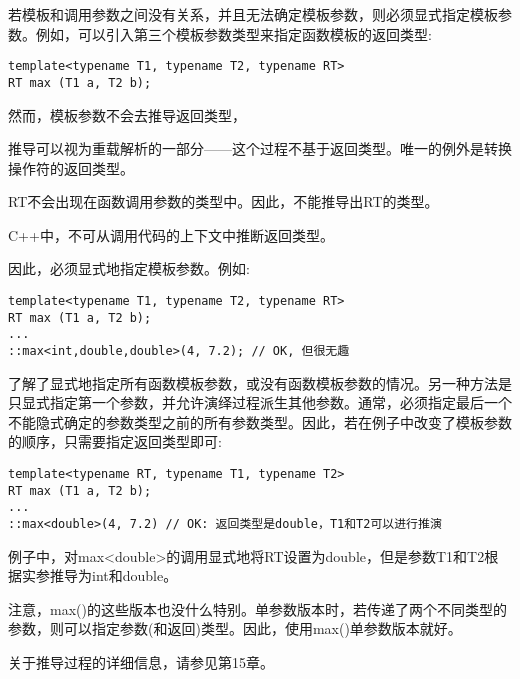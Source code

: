 若模板和调用参数之间没有关系，并且无法确定模板参数，则必须显式指定模板参数。例如，可以引入第三个模板参数类型来指定函数模板的返回类型:

\begin{lstlisting}[style=styleCXX]
template<typename T1, typename T2, typename RT>
RT max (T1 a, T2 b);
\end{lstlisting}

然而，模板参数不会去推导返回类型，

\begin{tcolorbox}[colback=webgreen!5!white,colframe=webgreen!75!black]
\hspace*{0.75cm}推导可以视为重载解析的一部分——这个过程不基于返回类型。唯一的例外是转换操作符的返回类型。
\end{tcolorbox}

RT不会出现在函数调用参数的类型中。因此，不能推导出RT的类型。

\begin{tcolorbox}[colback=webgreen!5!white,colframe=webgreen!75!black]
\hspace*{0.75cm}C++中，不可从调用代码的上下文中推断返回类型。
\end{tcolorbox}

因此，必须显式地指定模板参数。例如:

\begin{lstlisting}[style=styleCXX]
template<typename T1, typename T2, typename RT>
RT max (T1 a, T2 b);
...
::max<int,double,double>(4, 7.2); // OK, 但很无趣
\end{lstlisting}

了解了显式地指定所有函数模板参数，或没有函数模板参数的情况。另一种方法是只显式指定第一个参数，并允许演绎过程派生其他参数。通常，必须指定最后一个不能隐式确定的参数类型之前的所有参数类型。因此，若在例子中改变了模板参数的顺序，只需要指定返回类型即可:

\begin{lstlisting}[style=styleCXX]
template<typename RT, typename T1, typename T2>
RT max (T1 a, T2 b);
...
::max<double>(4, 7.2) // OK: 返回类型是double，T1和T2可以进行推演
\end{lstlisting}

例子中，对max<double>的调用显式地将RT设置为double，但是参数T1和T2根据实参推导为int和double。

注意，max()的这些版本也没什么特别。单参数版本时，若传递了两个不同类型的参数，则可以指定参数(和返回)类型。因此，使用max()单参数版本就好。

关于推导过程的详细信息，请参见第15章。

